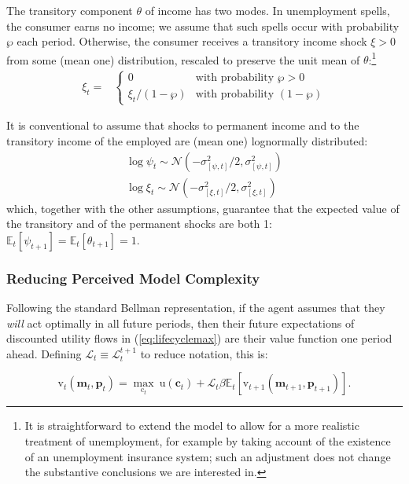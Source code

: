 \documentclass{article}
\newcommand{\uFunc}{\mathrm{u}}
\newcommand{\cLvl}{\mathbf{c}}
\newcommand{\mLvl}{\mathbf{m}}
\newcommand{\pLvl}{\mathbf{p}}
\newcommand{\DiscFac}{\beta}
\newcommand{\cFunc}{\mathrm{c}}
\newcommand{\vFunc}{\mathrm{v}}
\newcommand{\Alive}{\mathcal{L}}
\newcommand{\Ex}{\mathbb{E}}
\newcommand{\permShk}{\psi}
\newcommand{\tranShk}{\theta}
\newcommand{\pZero}{\wp}
\newcommand{\tranShkEmp}{\xi}
\begin{document}
The transitory component $\tranShk$ of income has two modes.
In unemployment spells, the consumer earns no income; we assume that such spells occur with probability $\pZero$ each period.
Otherwise, the consumer receives a transitory income shock $\xi > 0$ from some (mean one) distribution, rescaled to preserve the unit mean of $\tranShk$:\footnote{It is straightforward to extend the model to allow for a more realistic treatment of unemployment, for example by taking account of the existence of an unemployment insurance system; such an adjustment does not change the substantive conclusions we are interested in.}
\begin{align}
    \tranShkEmp_{t} = &
    \begin{cases}
        0\phantom{/\pZero} & \text{with probability $\pZero>0$}
        \\ \xi_{t}/(1-\pZero) & \text{with probability $(1-\pZero)$}
    \end{cases}
\end{align}

It is conventional to assume that shocks to permanent income and to the transitory income of the employed are (mean one) lognormally distributed:
\begin{align}
    \log \permShk_{t} \sim \mathcal{N}(-\sigma_{[\permShk, t]}^{2}/2,\sigma_{[\permShk, t]}^{2})
    \\ \log \xi_{t} \sim \mathcal{N}(-\sigma_{[\xi, t]}^{2}/2,\sigma_{[\xi, t]}^{2})
\end{align}
which, together with the other assumptions, guarantee that the expected value of the transitory and of the permanent shocks are both 1: $\Ex_{t}[\permShk_{t+1}]=\Ex_{t}[\tranShk_{t+1}]=1$.

\subsubsection{Reducing Perceived Model Complexity}

Following the standard Bellman representation, if the agent assumes that they \textit{will} act optimally in all future periods, then their future expectations of discounted utility flows in (\ref{eq:lifecyclemax}) are their value function one period ahead. Defining $\Alive_t \equiv \Alive_t^{t+1}$ to reduce notation, this is:

\begin{equation}
\label{eq:bellman}
\pmb{\vFunc}_{t}(\mLvl_{t},\pLvl_{t}) = \max_{\pmb{\cFunc}_{t}} ~ \uFunc(\cLvl_{t}) + \Alive_t \DiscFac  \Ex_{t}\left[ \pmb{\vFunc}_{t+1}(\mLvl_{t+1},\pLvl_{t+1}) \right].
\end{equation}
\end{document}
